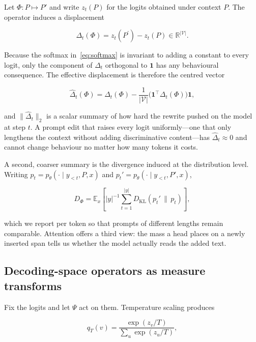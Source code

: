 \documentclass[conference]{IEEEtran}
\begin{document}
Let $\Phi : P \mapsto P'$ and write $z_t(P)$ for the logits obtained under context $P$. The operator induces a displacement

\begin{equation}
\Delta_{t}(\Phi) = z_{t}(P^{\prime}) - z_{t}(P) \in \mathbb{R}^{|\mathcal{V}|}.
\label{eq:delta}
\end{equation}

Because the softmax in~\eqref{eq:softmax} is invariant to adding a
constant to every logit, only the component of $\Delta_{t}$ orthogonal
to $\mathbf{1}$ has any behavioural consequence.  The effective
displacement is therefore the centred vector

\begin{equation}
\hat{\Delta}_{t}(\Phi) = \Delta_{t}(\Phi) - \frac{1}{|\mathcal{V}|}\big(\mathbf{1}^{\top}\Delta_{t}(\Phi)\big)\mathbf{1},
\label{eq:centred-delta}
\end{equation}

and $\|\hat{\Delta}_{t}\|_{2}$ is a scalar summary of how hard the
rewrite pushed on the model at step $t$.  A prompt edit that raises
every logit uniformly---one that only lengthens the context without
adding discriminative content---has $\hat{\Delta}_{t} \approx 0$ and
cannot change behaviour no matter how many tokens it costs.

A second, coarser summary is the divergence induced at the
distribution level.  Writing $p_{t} = p_{\theta}(\cdot \mid y_{<t}, P, x)$ and $p_{t}' = p_{\theta}(\cdot \mid y_{<t}, P', x)$,

\begin{equation}
D_{\Phi} = \mathbb{E}_{x}\left[ |y|^{-1} \sum_{t=1}^{|y|} D_{\mathrm{KL}}\left( p_{t}' \, \| \, p_{t} \right) \right],
\label{eq:divergence}
\end{equation}

which we report per token so that prompts of different lengths remain
comparable.  Attention offers a third view: the mass a head places on
a newly inserted span tells us whether the model actually reads the
added text.

\subsection{Decoding-space operators as measure transforms}
\label{sec:decoding-operators}

Fix the logits and let $\Psi$ act on them. Temperature scaling produces

\begin{equation}
q_{T}(v) = \frac{\exp(z_{v} / T)}{\sum_{u} \exp(z_{u} / T)},
\label{eq:temperature}
\end{equation}
\end{document}
